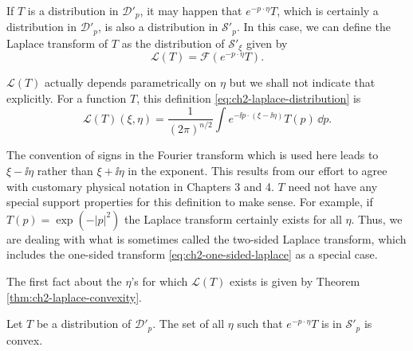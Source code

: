 If $T$ is a distribution in $\mathcal{D}'_p$, it may happen that
$e^{-p\cdot\eta}T$, which is certainly a distribution in $\mathcal{D}'_p$,
is also a distribution in $\mathcal{S}'_p$.  In this case, we can define the
Laplace transform of $T$ as the distribution of $\mathcal{S}'_\xi$ given by
\begin{equation}
  \mathcal{L}(T)=\mathcal{F}(e^{-p\cdot\eta}T).
  \tag{2-62}\label{eq:ch2-laplace-distribution}
\end{equation}

$\mathcal{L}(T)$ actually depends parametrically on $\eta$ but we shall
not indicate that explicitly.  For a function $T$, this definition \eqref{eq:ch2-laplace-distribution}
is
\begin{equation}
  \mathcal{L}(T)(\xi,\eta)
  =\frac{1}{(2\pi)^{n/2}}
    \int e^{-\ii p\cdot(\xi-\ii\eta)}T(p)\,\dd p .
  \tag{2-63}\label{eq:ch2-laplace-function}
\end{equation}

The convention of signs in the Fourier transform which is used here leads
to $\xi-\ii\eta$ rather than $\xi+\ii\eta$ in the exponent.  This results
from our effort to agree with customary physical notation in Chapters 3
and 4.  $T$ need not have any special support properties for this definition
to make sense.  For example, if $T(p)=\exp(-|p|^2)$ the Laplace transform
certainly exists for all $\eta$.  Thus, we are dealing with what is
sometimes called the two-sided Laplace transform, which includes the
one-sided transform \eqref{eq:ch2-one-sided-laplace} as a special case.

The first fact about the $\eta$'s for which $\mathcal{L}(T)$ exists is given
by Theorem \ref{thm:ch2-laplace-convexity}.

\begin{theorem}[2-5]\label{thm:ch2-laplace-convexity}
Let $T$ be a distribution of $\mathcal{D}'_p$.  The set of all $\eta$ such
that $e^{-p\cdot\eta}T$ is in $\mathcal{S}'_p$ is convex.
\end{theorem}

